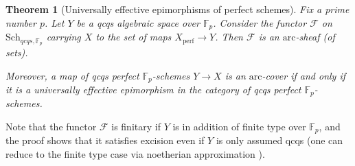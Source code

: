 \documentclass[reqno]{amsart}
\newcommand{\sF}{\mathcal{F}}
\newcommand{\arc}{\mathrm{arc}}
\newtheorem{theorem}{Theorem}[section]
\theoremstyle{definition}
\begin{document}
\begin{theorem}[Universally effective epimorphisms of perfect schemes]
\label{PerfRepArcSheaf}
Fix a prime number $p$. Let $Y$ be a qcqs algebraic space over $\mathbb{F}_p$. Consider the functor $\sF$ on  $\mathrm{Sch}_{qcqs,\mathbb{F}_p}$ carrying $X$ to the set of maps $X_{\mathrm{perf}} \to Y$. Then  $\sF$ is an $\arc$-sheaf (of sets). 

Moreover, a map of qcqs perfect $\mathbb{F}_p$-schemes $Y \to X$ is
an $\arc$-cover if and only if it is a universally effective
epimorphism 
in the category of qcqs perfect $\mathbb{F}_p$-schemes. \end{theorem} 

Note that the functor $\sF$ is finitary if $Y$ is in addition of finite type over $\mathbb{F}_p$, and the proof shows that it satisfies excision even if $Y$ is only assumed qcqs (one can reduce to the finite type case via noetherian approximation \cite{RNoeth}). 
\end{document}
